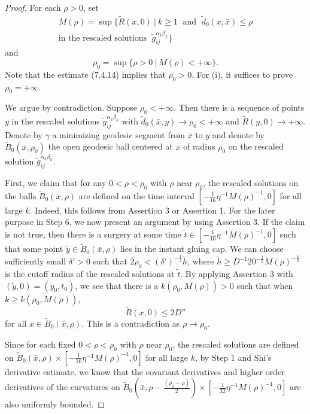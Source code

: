 \begin{proof}
For each $\rho>0$, set
\begin{multline*}
M(\rho)=\sup\Big\{\tilde{R}(x,0)\ |\ k \geq 1\; \mbox{ and }\;
\tilde{d}_0(x,\bar{x})\leq\rho \\
\mbox{in the rescaled solutions } \;
\tilde{g}^{\alpha_k\beta_k}_{ij}\Big\}
\end{multline*}
and
$$
\rho_0=\sup\{\rho > 0\ |\ M(\rho)<+\infty\}.
$$
Note that the estimate (7.4.14) implies that $\rho_0>0$. For (i),
it suffices to prove $\rho_0=+\infty$.

We argue by contradiction. Suppose $\rho_0<+\infty$. Then there is
a sequence of points $y$ in the rescaled solutions
$\tilde{g}^{\alpha_k\beta_k}_{ij}$ with
$\tilde{d}_0(\bar{x},y)\rightarrow\rho_0<+\infty$ and
$\tilde{R}(y,0)\rightarrow +\infty$. Denote by $\gamma$ a
minimizing geodesic segment from $\bar{x}$ to $y$ and denote by
$\tilde{B}_0(\bar{x},\rho_0)$ the open geodesic ball centered at
$\bar{x}$ of radius $\rho_0$ on the rescaled solution
$\tilde{g}^{\alpha_k\beta_k}_{ij}$.

First, we claim that for any $0<\rho<\rho_0$ with $\rho$ near
$\rho_0$, the rescaled solutions on the balls
$\tilde{B}_{0}(\bar{x},\rho)$ are defined on the time interval
$[-\frac{1}{16}\eta^{-1}M(\rho)^{-1},0]$ for all large $k$.
Indeed, this follows from Assertion 3 or Assertion 1. For the
later purpose in Step 6, we now present an argument by using
Assertion 3.  If the claim is not true, then there is a surgery at
some time $\tilde{t} \in [-\frac{1}{16}\eta^{-1}M(\rho)^{-1},0]$
such that some point $\tilde{y}\in \tilde{B}_{0}(\bar{x},\rho) $
lies in the instant gluing cap.  We can choose sufficiently small
$\delta'>0$ such that $2\rho_0<(\delta')^{-\frac{1}{2}}\tilde{h}$,
where $\tilde{h} \geq
D^{-1}20^{-\frac{1}{2}}M(\rho)^{-\frac{1}{2}}$ is the cutoff
radius of the rescaled solutions at $\tilde{t}$. By applying
Assertion 3 with $(\tilde{y},0)=(y_0,t_0)$, we see that there is a
$k(\rho_0,M(\rho))>0$ such that when $k\geq k(\rho_0,M(\rho))$,
$$
\widetilde{R}(x,0)\leq 2D''
$$
for all $x\in \widetilde{B}_{0}(\bar{x},\rho)$. This is a
contradiction as $\rho\rightarrow\rho_0$.

Since for each fixed $0<\rho<\rho_0$ with $\rho$ near $\rho_0$,
the rescaled solutions are defined on
$\tilde{B}_{0}(\bar{x},\rho)\times
[-\frac{1}{16}\eta^{-1}M(\rho)^{-1},0]$ for all large $k$, by Step
1 and Shi's derivative estimate, we know that the covariant
derivatives and higher order derivatives of the curvatures on
$\tilde{B}_{0}(\bar{x},\rho -
\frac{(\rho_0-\rho)}{2})\times[-\frac{1}{32}\eta^{-1}M(\rho)^{-1},0]$
are also uniformly bounded.


\end{proof}
